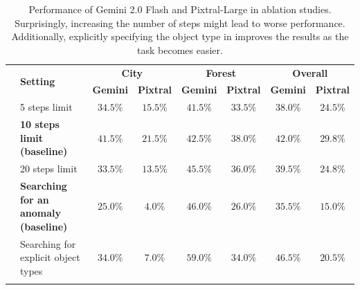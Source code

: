 \begin{table}[t]
\centering
\scriptsize
\caption{Performance of Gemini 2.0 Flash and Pixtral-Large in ablation studies. Surprisingly, increasing the number of steps might lead to worse performance. Additionally, explicitly specifying the object type in \anomalychallenge{} improves the results as the task becomes easier.}
\label{tab:ablations}
\begin{tabular}{llcccccc}
\toprule
& \multirow{2}{*}{\textbf{Setting}} & \multicolumn{2}{c}{\textbf{City}} & \multicolumn{2}{c}{\textbf{Forest}} & \multicolumn{2}{c}{\textbf{Overall}}   \\
\cmidrule(lr){3-4} \cmidrule(lr){5-6} \cmidrule(lr){7-8} 
&&\textbf{Gemini} & \textbf{Pixtral} & \textbf{Gemini} & \textbf{Pixtral}  & \textbf{Gemini} & \textbf{Pixtral} \\
\midrule
\multirow{3}{*}{\challenge{}}&{5 steps limit} & $34.5\%$ & $15.5\%$ & $41.5\%$ & $33.5\%$ & $38.0\%$ & $24.5\%$ \\
&\textbf{10 steps limit (baseline)} & $\mathbf{41.5\%}$ & $\mathbf{21.5\%}$ & $42.5\%$ & $\mathbf{38.0\%}$ & $\mathbf{42.0\%}$ & $\mathbf{29.8\%}$ \\
&{20 steps limit} & $33.5\%$ & $13.5\%$ & $\mathbf{45.5\%}$ & $36.0\%$ & $39.5\%$ & $24.8\%$ \\
\midrule
\multirow{2}{*}{\anomalychallenge{}}&\textbf{Searching for an anomaly (baseline)} & $25.0\%$ & $4.0\%$ & $46.0\%$ & $26.0\%$ & $35.5\%$ & $15.0\%$ \\
&{Searching for explicit object types} & $\mathbf{34.0\%}$ & $\mathbf{7.0\%}$ & $\mathbf{59.0\%}$ & $\mathbf{34.0\%}$ & $\mathbf{46.5\%}$ & $\mathbf{20.5\%}$ \\
\bottomrule \\
\end{tabular}
\end{table}